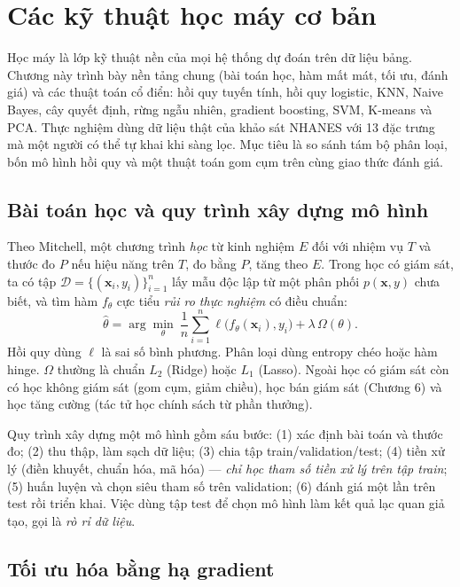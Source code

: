 \chapter{Các kỹ thuật học máy cơ bản}
\label{chap:ml}

Học máy là lớp kỹ thuật nền của mọi hệ thống dự đoán trên dữ liệu bảng. Chương này trình bày nền tảng chung (bài toán học, hàm mất mát, tối ưu, đánh giá) và các thuật toán cổ điển: hồi quy tuyến tính, hồi quy logistic, KNN, Naive Bayes, cây quyết định, rừng ngẫu nhiên, gradient boosting, SVM, K-means và PCA. Thực nghiệm dùng dữ liệu thật của khảo sát NHANES với 13 đặc trưng mà một người có thể tự khai khi sàng lọc. Mục tiêu là so sánh tám bộ phân loại, bốn mô hình hồi quy và một thuật toán gom cụm trên cùng giao thức đánh giá.

\section{Bài toán học và quy trình xây dựng mô hình}

Theo Mitchell, một chương trình \emph{học} từ kinh nghiệm $E$ đối với nhiệm vụ $T$ và thước đo $P$ nếu hiệu năng trên $T$, đo bằng $P$, tăng theo $E$. Trong học có giám sát, ta có tập $\mathcal D=\{(\mathbf x_i, y_i)\}_{i=1}^n$ lấy mẫu độc lập từ một phân phối $p(\mathbf x, y)$ chưa biết, và tìm hàm $f_\theta$ cực tiểu \emph{rủi ro thực nghiệm} có điều chuẩn:
\begin{equation}
\hat\theta = \arg\min_\theta\ \frac1n \sum_{i=1}^n \ell\big(f_\theta(\mathbf x_i), y_i\big) + \lambda\, \Omega(\theta).
\label{eq:erm}
\end{equation}
Hồi quy dùng $\ell$ là sai số bình phương. Phân loại dùng entropy chéo hoặc hàm hinge. $\Omega$ thường là chuẩn $L_2$ (Ridge) hoặc $L_1$ (Lasso). Ngoài học có giám sát còn có học không giám sát (gom cụm, giảm chiều), học bán giám sát (Chương 6) và học tăng cường (tác tử học chính sách từ phần thưởng).

Quy trình xây dựng một mô hình gồm sáu bước: (1) xác định bài toán và thước đo; (2) thu thập, làm sạch dữ liệu; (3) chia tập train/validation/test; (4) tiền xử lý (điền khuyết, chuẩn hóa, mã hóa) — \emph{chỉ học tham số tiền xử lý trên tập train}; (5) huấn luyện và chọn siêu tham số trên validation; (6) đánh giá một lần trên test rồi triển khai. Việc dùng tập test để chọn mô hình làm kết quả lạc quan giả tạo, gọi là \emph{rò rỉ dữ liệu}.

\section{Tối ưu hóa bằng hạ gradient}

